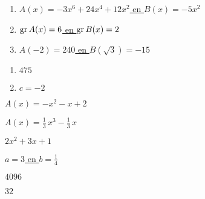 \documentclass{ximera}
\begin{document}
    \begin{Antwoord} \label{antw1.11}
    \begin{enumerate}
    \item
    \hyperlink{oef1.11}{$A(x) = -3x^6+24x^4+12x^2$ en $B(x) = -5x^2$}
    \item
    \hyperlink{oef1.11}{$\operatorname{gr} A(x) = 6$ en $\operatorname{gr} B(x) = 2$}
    \item
    \hyperlink{oef1.11}{$A(-2) = 240$ en $B(\sqrt{3}) = -15$}
    \end{enumerate}
    \end{Antwoord}
    
    
    \begin{Antwoord} \label{antw1.12}
    \begin{enumerate}
    \item
    \hyperlink{oef1.12}{$475$}
    \item
    \hyperlink{oef1.12}{$c = -2$}
    \end{enumerate}
    \end{Antwoord}
    
    \begin{Antwoord} \label{antw1.13}
    \hyperlink{oef1.13}{$A(x) = -x^2-x+2$}
    \end{Antwoord}
    
    \begin{Antwoord} \label{antw1.14}
    \hyperlink{oef1.14}{$A(x) = \frac{1}{3}\,x^3-\frac{1}{3}\,x$}
    \end{Antwoord}
    
    \begin{Antwoord} \label{antw1.15}
    \hyperlink{oef1.15}{$2x^2+3x+1$}
    \end{Antwoord}
    
    \begin{Antwoord} \label{antw1.16}
    \hyperlink{oef1.16}{$a = 3$ en $b = \frac{1}{4}$}
    \end{Antwoord}
    
    \begin{Antwoord} \label{antw1.17}
    \hyperlink{oef1.17}{$4096$}
    \end{Antwoord}
    
    \begin{Antwoord} \label{antw1.18}
    \hyperlink{oef1.18}{$32$}
    \setcounter{enumi}{0}
    \end{Antwoord}
    
\end{document}
